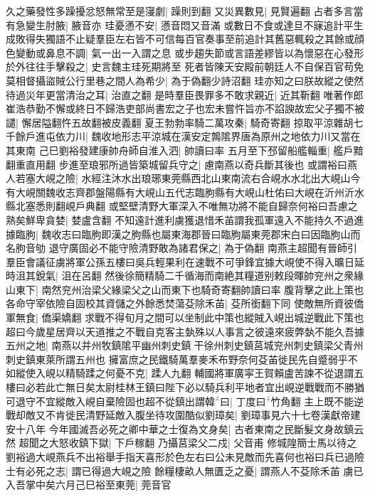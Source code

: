 久之藥發性多躁擾忿怒無常至是寖劇|{
	躁則到翻}
又災異數見|{
	見賢遍翻}
占者多言當有急變生肘腋|{
	腋音亦}
珪憂懣不安|{
	懣音悶又音滿}
或數日不食或達旦不寐追計平生成敗得失獨語不止疑羣臣左右皆不可信每百官奏事至前追計其舊惡輒殺之其餘或顔色變動或鼻息不調|{
	氣一出一入謂之息}
或步趨失節或言語差繆皆以為懷惡在心發形於外往往手擊殺之|{
	史言魏主珪死期將至}
死者皆陳天安殿前朝廷人不自保百官苟免莫相督攝盜賊公行里巷之間人為希少|{
	為于偽翻少詩沼翻}
珪亦知之曰朕故縱之使然待過災年更當清治之耳|{
	治直之翻}
是時羣臣畏罪多不敢求親近|{
	近其靳翻}
唯著作郎崔浩恭勤不懈或終日不歸浩吏部尚書宏之子也宏未嘗忤旨亦不諂諛故宏父子獨不被譴|{
	懈居隘翻忤五故翻被皮義翻}
夏王勃勃率騎二萬攻秦|{
	騎奇寄翻}
掠取平涼雜胡七千餘戶進屯依力川|{
	魏收地形志平涼城在漢安定鶉隂界唐為原州之地依力川又當在其東南}
己巳劉裕發建康帥舟師自淮入泗|{
	帥讀曰率}
五月至下邳留船艦輜重|{
	艦戶黯翻重直用翻}
步進至琅邪所過皆築城留兵守之|{
	慮南燕以奇兵斷其後也}
或謂裕曰燕人若塞大峴之險|{
	水經注沐水出琅琊東莞縣西北山東南流右合峴水水北出大峴山今有大峴關魏收志齊郡盤陽縣有大峴山五代志臨胊縣有大峴山杜佑曰大峴在沂州沂水縣北塞悉則翻峴戶典翻}
或堅壁清野大軍深入不唯無功將不能自歸奈何裕曰吾慮之熟矣鮮卑貪婪|{
	婪盧含翻}
不知遠計進利虜獲退惜禾苖謂我孤軍遠入不能持久不過進據臨朐|{
	魏收志曰臨朐即漢之朐縣也屬東海郡晉曰臨胊屬東莞郡宋白曰因臨胊山而名朐音劬}
退守廣固必不能守險清野敢為諸君保之|{
	為于偽翻}
南燕主超聞有晉師引羣臣會議征虜將軍公孫五樓曰吳兵輕果利在速戰不可爭鋒宜據大峴使不得入曠日延時沮其銳氣|{
	沮在呂翻}
然後徐簡精騎二千循海而南絶其糧道别敕段暉帥兖州之衆緣山東下|{
	南然兖州治梁父緣梁父之山而東下也騎奇寄翻帥讀曰率}
腹背擊之此上策也各命守宰依險自固校其資儲之外餘悉焚蕩芟除禾苖|{
	芟所銜翻下同}
使敵無所資彼僑軍無食|{
	僑渠嬌翻}
求戰不得旬月之間可以坐制此中策也縱賊入峴出城逆戰此下策也超曰今歲星居齊以天道推之不戰自克客主埶殊以人事言之彼遠來疲弊埶不能久吾據五州之地|{
	南燕以并州牧鎮隂平幽州刺史鎮干徐州刺史鎮莒城兖州刺史鎮梁父青州刺史鎮東萊所謂五州也}
擁富庶之民鐵騎萬羣麥禾布野奈何芟苖徙民先自蹙弱乎不如縱使入峴以精騎蹂之何憂不克|{
	蹂人九翻}
輔國將軍廣寜王賀賴盧苦諫不從退謂五樓曰必若此亡無日矣太尉桂林王鎮曰陛下必以騎兵利平地者宜出峴逆戰戰而不勝猶可退守不宜縱敵入峴自棄險固也超不從鎮出謂韓曰|{
	丁度曰竹角翻}
主上既不能逆戰却敵又不肯徙民清野延敵入腹坐待攻圍酷似劉璋矣|{
	劉璋事見六十七卷漢獻帝建安十八年}
今年國滅吾必死之卿中華之士復為文身矣|{
	古者東南之民斷髮文身故鎮云然}
超聞之大怒收鎮下獄|{
	下戶稼翻}
乃攝莒梁父二戍|{
	父音甫}
修城隍簡士馬以待之劉裕過大峴燕兵不出裕舉手指天喜形於色左右曰公未見敵而先喜何也裕曰兵已過險士有必死之志|{
	謂已得過大峴之險}
餘糧棲畝人無匱乏之憂|{
	謂燕人不芟除禾苖}
虜已入吾掌中矣六月己巳裕至東莞|{
	莞音官}
